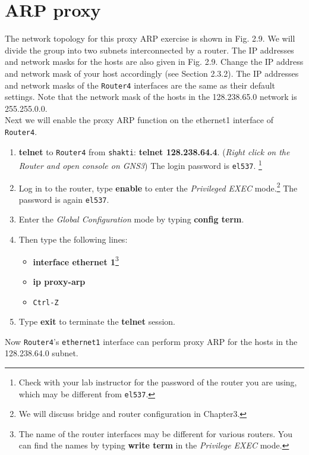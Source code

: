 \documentclass[10pt,a4paper]{article}
\numberwithin{equation}{section}
\numberwithin{figure}{section}
\numberwithin{table}{section}
\begin{document}
\section{ARP proxy}
    The network topology for this proxy ARP exercise is shown in Fig. 2.9. We will divide the group into two subnets interconnected by a router. The IP addresses and network masks for the hosts are also given in Fig. 2.9. Change the IP address and network mask of your host accordingly (see Section 2.3.2). The IP addresses and network masks of the \texttt{Router4} interfaces are the same as their default settings.
    Note that the network mask of the hosts in the 128.238.65.0 network is 255.255.0.0. \\
    Next we will enable the proxy ARP function on the ethernet1 interface of \texttt{Router4}. \\
    \begin{enumerate}
        \item \textbf{telnet} to \texttt{Router4} from \texttt{shakti}: \textbf{telnet 128.238.64.4}. (\textit{Right click on the Router and open console on GNS3})
        The login password is \texttt{el537}. \footnote{Check with your lab instructor for the password of the router you are using, which may be different from \texttt{el537}.}
        \item Log in to the router, type \textbf{enable} to enter the \textit{Privileged EXEC} mode.\footnote{We will discuss bridge and router configuration in Chapter3.} The password is again \texttt{el537}.
        \item Enter the \textit{Global Configuration} mode by typing \textbf{config term}.
        \item Then type the following lines:
        \begin{itemize}
            \item \textbf{interface ethernet 1}\footnote{The name of the router interfaces may be different for various routers.
            You can find the names by typing \textbf{write term} in the \textit{Privilege EXEC} mode.}
            \item \textbf{ip proxy-arp}
            \item \texttt{Ctrl-Z}
        \end{itemize}
        \item Type \textbf{exit} to terminate the \textbf{telnet} session.
    \end{enumerate}
    Now \texttt{Router4}’s \texttt{ethernet1} interface can perform proxy ARP for the hosts in the 128.238.64.0 subnet. \\
\end{document}
